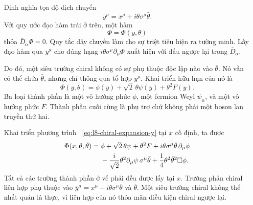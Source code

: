 Định nghĩa tọa độ dịch chuyển
\begin{equation}
y^\mu=x^\mu+i\theta\sigma^\mu\bar\theta.
\label{eq:l8-chiral-coordinate}
\end{equation}
Với quy ước đạo hàm trái ở trên, một hàm
\begin{equation}
\Phi=\Phi(y,\theta)
\label{eq:l8-chiral-solution}
\end{equation}
thỏa \(\bar D_{\dot\alpha}\Phi=0\). Quy tắc dây chuyền làm cho sự triệt tiêu hiện ra tường minh. Lấy đạo hàm qua \(y^\mu\) cho đúng hạng \(i\theta\sigma^\mu\partial_\mu\Phi\) xuất hiện với dấu ngược lại trong \(\bar D_{\dot\alpha}\).

Do đó, một siêu trường chiral không có sự phụ thuộc độc lập nào vào \(\bar\theta\). Nó vẫn có thể chứa \(\bar\theta\), nhưng chỉ thông qua tổ hợp \(y^\mu\). Khai triển hữu hạn của nó là
\begin{equation}
\Phi(y,\theta)
=\phi(y)+\sqrt2\,\theta\psi(y)+\theta^2F(y).
\label{eq:l8-chiral-expansion-y}
\end{equation}
Ba loại thành phần là một vô hướng phức \(\phi\), một fermion Weyl \(\psi_\alpha\), và một vô hướng phức \(F\). Thành phần cuối cùng là phụ trợ chứ không phải một boson lan truyền thứ hai.

\begin{classroomqa}
\end{classroomqa}

Khai triển phương trình ~\eqref{eq:l8-chiral-expansion-y} tại \(x\) cố định, ta được
\begin{align}
\Phi(x,\theta,\bar\theta)
={}&\phi
+\sqrt2\,\theta\psi
+\theta^2F
+i\theta\sigma^\mu\bar\theta\,\partial_\mu\phi
\notag\\
&-\frac{i}{\sqrt2}\theta^2
\partial_\mu\psi\,\sigma^\mu\bar\theta
+\frac14\theta^2\bar\theta^2\Box\phi.
\label{eq:l8-chiral-expansion-x}
\end{align}
Tất cả các trường thành phần ở vế phải đều được lấy tại \(x\). Trường phản chiral liên hợp phụ thuộc vào
\(\bar y^\mu=x^\mu-i\theta\sigma^\mu\bar\theta\) và \(\bar\theta\). Một siêu trường chiral không thể nhất quán là thực, vì liên hợp của nó thỏa mãn điều kiện chiral ngược lại.

